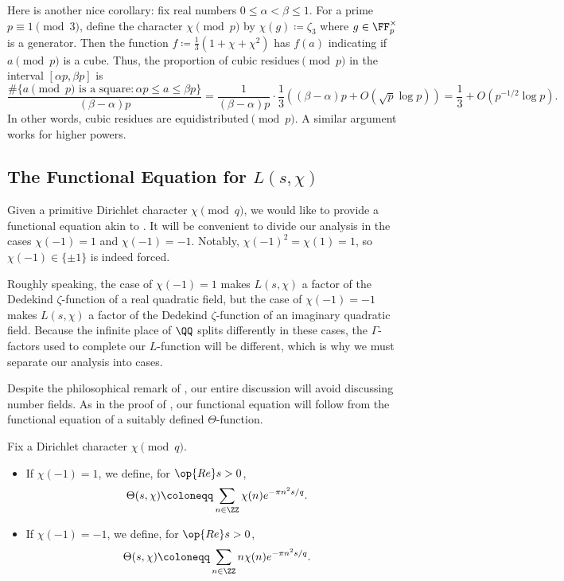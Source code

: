 \documentclass[../notes.tex]{subfiles}
\begin{document}
\begin{remark}[Nir]
	Here is another nice corollary: fix real numbers $0\le\alpha<\beta\le1$. For a prime $p\equiv1\pmod3$, define the character $\chi\pmod p$ by $\chi(g)\coloneqq\zeta_3$ where $g\in\FF_p^\times$ is a generator. Then the function $f\coloneqq\frac13\left(1+\chi+\chi^2\right)$ has $f(a)$ indicating if $a\pmod p$ is a cube. Thus, the proportion of cubic residues$\pmod p$ in the interval $[\alpha p,\beta p]$ is
	\[\frac{\#\{a\pmod p\text{ is a square}:\alpha p\le a\le \beta p\}}{(\beta-\alpha)p}=\frac1{(\beta-\alpha)p}\cdot\frac13((\beta-\alpha)p+O(\sqrt p\log p))=\frac13+O\left(p^{-1/2}\log p\right).\]
	In other words, cubic residues are equidistributed$\pmod p$. A similar argument works for higher powers.
\end{remark}

\subsection{The Functional Equation for \texorpdfstring{$L(s,\chi)$}{ L(s, chi)}}
Given a primitive Dirichlet character $\chi\pmod q$, we would like to provide a functional equation akin to . It will be convenient to divide our analysis in the cases $\chi(-1)=1$ and $\chi(-1)=-1$. Notably, $\chi(-1)^2=\chi(1)=1$, so $\chi(-1)\in\{\pm1\}$ is indeed forced.
\begin{remark} \label{rem:why-sign-chi}
	Roughly speaking, the case of $\chi(-1)=1$ makes $L(s,\chi)$ a factor of the Dedekind $\zeta$-function of a real quadratic field, but the case of $\chi(-1)=-1$ makes $L(s,\chi)$ a factor of the Dedekind $\zeta$-function of an imaginary quadratic field. Because the infinite place of $\QQ$ splits differently in these cases, the $\Gamma$-factors used to complete our $L$-function will be different, which is why we must separate our analysis into cases.
\end{remark}
Despite the philosophical remark of , our entire discussion will avoid discussing number fields. As in the proof of , our functional equation will follow from the functional equation of a suitably defined $\Theta$-function.
\begin{definition}
	Fix a Dirichlet character $\chi\pmod q$.
	\begin{itemize}
		\item If $\chi(-1)=1$, we define, for $\op{Re}s>0$,
		\[\Theta(s,\chi)\coloneqq\sum_{n\in\ZZ}\chi(n)e^{-\pi n^2s/q}.\]
		\item If $\chi(-1)=-1$, we define, for $\op{Re}s>0$,
		\[\Theta(s,\chi)\coloneqq\sum_{n\in\ZZ}n\chi(n)e^{-\pi n^2s/q}.\]
	\end{itemize}
\end{definition}
\end{document}
